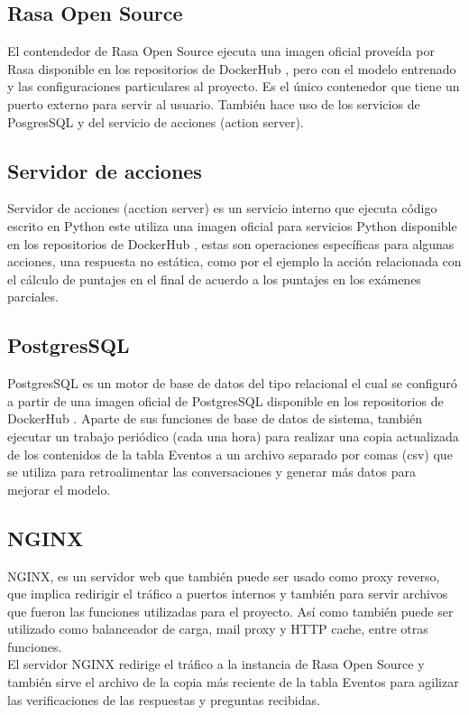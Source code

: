 \subsection{Rasa Open Source}
El contendedor de Rasa Open Source ejecuta una imagen oficial proveída por Rasa disponible en los repositorios de DockerHub \cite{DockerHub}, pero con el modelo entrenado y las configuraciones
particulares al proyecto. Es el único contenedor que tiene un puerto externo para servir al usuario. También hace uso de los servicios de PosgresSQL y del servicio de acciones (action server).

\subsection{Servidor de acciones}
Servidor de acciones (acction server) es un servicio interno que ejecuta código escrito en Python este utiliza una imagen oficial para servicios Python disponible en los repositorios de
DockerHub \cite{DockerHub}, estas son operaciones específicas para algunas acciones, una respuesta no estática, como por el ejemplo la acción relacionada con el cálculo de puntajes en el final de acuerdo a los puntajes en los exámenes parciales.

\subsection{PostgresSQL}
PostgresSQL es un motor de base de datos del tipo relacional\cite{postgresql} el cual se configuró
a partir de una imagen oficial de PostgresSQL disponible en los repositorios de DockerHub \cite{DockerHub}. Aparte de sus funciones de base de datos de sistema, también ejecutar un
trabajo periódico (cada una hora) para realizar una copia actualizada de los contenidos de la tabla
Eventos a un archivo separado por comas (csv) que se utiliza para retroalimentar las conversaciones y generar más datos para mejorar el modelo.

\subsection{NGINX}

NGINX, es un servidor web que también puede ser usado como proxy reverso, que implica redirigir el
tráfico a puertos internos y también para servir archivos que fueron las funciones utilizadas para
el proyecto. Así como también puede ser utilizado como balanceador de carga, mail proxy y HTTP
cache, entre otras funciones. \cite{NGINX}\\
El servidor NGINX redirige el tráfico a la instancia de Rasa Open Source y también sirve el archivo de la copia más reciente de la tabla Eventos para agilizar las verificaciones de las respuestas y
preguntas recibidas.

